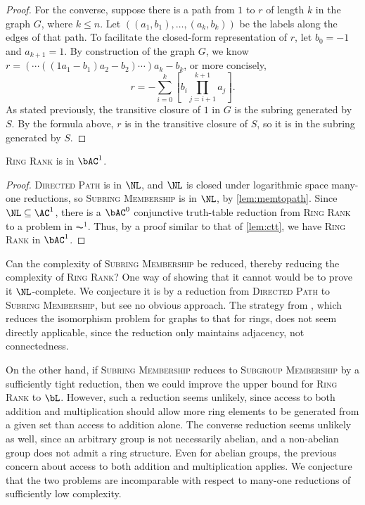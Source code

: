 \begin{proof}
  For the converse, suppose there is a path from $1$ to $r$ of length $k$ in the graph $G$, where $k \leq n$.
  Let $((a_1, b_1), \dotsc, (a_k, b_k))$ be the labels along the edges of that path.
  To facilitate the closed-form representation of $r$, let $b_0 = -1$ and $a_{k + 1} = 1$.
  By construction of the graph $G$, we know $r = (\dotsb ((1 a_1 - b_1) a_2 - b_2) \dotsb) a_k - b_k$, or more concisely,
  \begin{equation*}
    r = -\sum_{i = 0}^k \left[b_i \prod_{j = i + 1}^{k + 1} a_j\right].
  \end{equation*}
  As stated previously, the transitive closure of $1$ in $G$ is the subring generated by $S$.
  By the formula above, $r$ is in the transitive closure of $S$, so it is in the subring generated by $S$.
\end{proof}

\begin{theorem}\label{thm:ringrank}
  \textsc{Ring Rank} is in $\bAC^1$.
\end{theorem}
\begin{proof}
  \textsc{Directed Path} is in $\NL$, and $\NL$ is closed under logarithmic space many-one reductions, so \textsc{Subring Membership} is in $\NL$, by \autoref{lem:memtopath}.
  Since $\NL \subseteq \AC^1$, there is a $\bAC^0$ conjunctive truth-table reduction from \textsc{Ring Rank} to a problem in $\AC^1$.
  Thus, by a proof similar to that of \autoref{lem:ctt}, we have \textsc{Ring Rank} in $\bAC^1$.
\end{proof}

Can the complexity of \textsc{Subring Membership} be reduced, thereby reducing the complexity of \textsc{Ring Rank}?
One way of showing that it cannot would be to prove it $\NL$-complete.
We conjecture it is by a reduction from \textsc{Directed Path} to \textsc{Subring Membership}, but see no obvious approach.
The strategy from \autocite[Theorem~4.4]{ks06}, which reduces the isomorphism problem for graphs to that for rings, does not seem directly applicable, since the reduction only maintains adjacency, not connectedness.

On the other hand, if \textsc{Subring Membership} reduces to \textsc{Subgroup Membership} by a sufficiently tight reduction, then we could improve the upper bound for \textsc{Ring Rank} to $\bL$.
However, such a reduction seems unlikely, since access to both addition and multiplication should allow more ring elements to be generated from a given set than access to addition alone.
The converse reduction seems unlikely as well, since an arbitrary group is not necessarily abelian, and a non-abelian group does not admit a ring structure.
Even for abelian groups, the previous concern about access to both addition and multiplication applies.
We conjecture that the two problems are incomparable with respect to many-one reductions of sufficiently low complexity.
